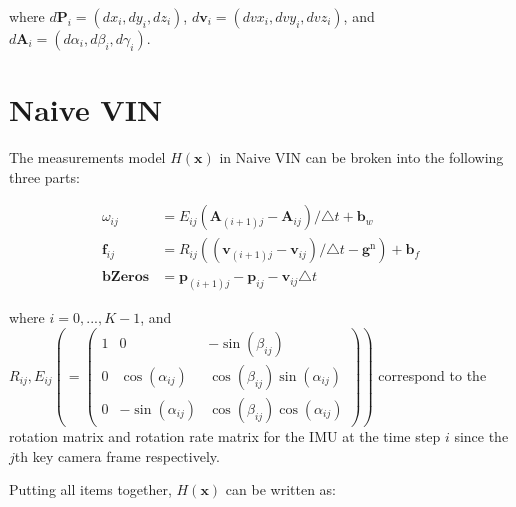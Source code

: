 \documentclass[12pt]{article}   %
\begin{document}
\begin{appendices}
where $d\textbf{P}_{i} = (dx_{i}, dy_{i}, dz_{i}) $, $d\textbf{v}_{i} =
(dvx_{i}, dvy_{i}, dvz_{i}) $, and $d\textbf{A}_{i} = (d\alpha_{i}, d\beta_{i},
d\gamma_{i}) $.

\section{Naive VIN}
\label{apn:naiveVin}
The measurements model $H(\textbf{x})$ in Naive VIN can be broken into the
following three parts:

\begin{align}
\omega_{ij} &= E_{ij} (\textbf{A}_{(i+1)j} - \textbf{A}_{ij})/\triangle t + \textbf{b}_w \\
\textbf{f}_{ij} &= R_{ij} ((\textbf{v}_{(i+1)j} - \textbf{v}_{ij}) / \triangle t - \textbf{g}^{\mathrm{n}}) + \textbf{b}_f \\
\textbf{bZeros} &= \textbf{p}_{(i+1)j} - \textbf{p}_{ij} - \textbf{v}_{ij} \triangle t
\end{align}

where $i = 0,..., K-1$, and $R_{ij}, E_{ij} ( = \begin{pmatrix} 1 & 0 &
-\sin(\beta_{ij}) \\ 0 & \cos(\alpha_{ij}) & \cos(\beta_{ij})\sin(\alpha_{ij})
\\ 0 & -\sin(\alpha_{ij}) & \cos(\beta_{ij})\cos(\alpha_{ij}) \end{pmatrix}) $
correspond to the rotation matrix and rotation rate matrix for the IMU at the
time step $i$ since the $j$th key camera frame respectively.

Putting all items together, $H(\textbf{x})$ can be written as:


\end{appendices}
\end{document}
